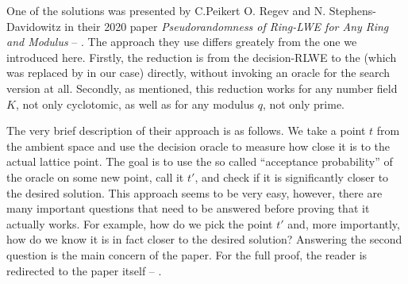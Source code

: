 One of the solutions was presented by C.Peikert O. Regev and N. Stephens-Davidowitz in their 2020 paper \textit{Pseudorandomness of Ring-LWE for Any Ring and Modulus} -- \cite{oracle}. The approach they use differs greately from the one we introduced here. Firstly, the reduction is from the decision-RLWE to the  (which was replaced by  in our case) directly, without invoking an oracle for the search version at all. Secondly, as mentioned, this reduction works for any number field $K$, not only cyclotomic, as well as for any modulus $q$, not only prime.

The very brief description of their approach is as follows. We take a point $t$ from the ambient space and use the decision oracle to measure how close it is to the actual lattice point. The goal is to use the so called ``acceptance probability'' of the oracle on some new point, call it $t'$, and check if it is significantly closer to the desired solution. This approach seems to be very easy, however, there are many important questions that need to be answered before proving that it actually works. For example, how do we pick the point $t'$ and, more importantly, how do we know it is in fact closer to the desired solution? Answering the second question is the main concern of the paper. For the full proof, the reader is redirected to the paper itself -- \cite{oracle}.
